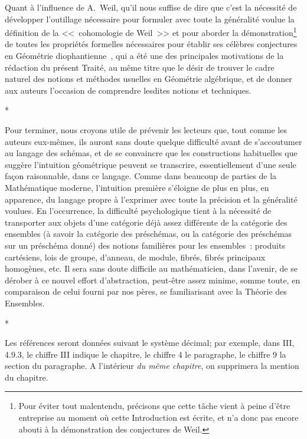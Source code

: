 Quant à l'influence de A.~Weil, qu'il nous suffise de dire que c'est la nécessité de développer l'outillage nécessaire pour formuler avec toute la généralité voulue la définition de la <<~cohomologie de Weil~>> et pour aborder la démonstration\footnote{Pour éviter tout malentendu, précisons que cette tâche vient à peine d'être entreprise au moment où cette Introduction est écrite, et n'a donc pas encore abouti à la démonstration des conjectures de Weil.} de toutes les propriétés formelles nécessaires pour établir ses célèbres conjectures en Géométrie diophantienne~\cite{I-19}, qui a été une des principales motivations de la rédaction du présent Traité, au même titre que le désir de trouver le cadre naturel des notions et méthodes usuelles en Géométrie algébrique, et de donner aux auteurs l'occasion de comprendre lesdites notions et techniques.

\bigskip
\begin{center}*\quad*\quad*\end{center}
\bigskip

Pour terminer, nous croyons utile de prévenir les lecteurs que, tout comme les auteurs eux-mêmes, ils auront sans doute quelque difficulté avant de s'accoutumer au langage des schémas, et de se convaincre que les constructions habituelles que suggère l'intuition géométrique peuvent se transcrire, essentiellement d'une seule façon raisonnable, dans ce langage.
Comme dans beaucoup de parties de la Mathématique moderne, l'intuition première s'éloigne de plus en plus, en apparence, du langage propre à l'exprimer avec toute la précision et la généralité voulues.
En l'occurrence, la difficulté psychologique tient à la nécessité de transporter aux objets d'une catégorie déjà assez différente de la catégorie des ensembles (à savoir la catégorie des préschémas, ou la catégorie des préschémas sur un préschéma donné) des notions familières pour les ensembles~: produits cartésiens, lois de groupe, d'anneau, de module, fibrés, fibrés principaux homogènes, etc.
Il sera sans doute difficile au mathématicien, dans l'avenir, de se dérober à ce nouvel effort d'abstraction, peut-être assez minime, somme toute, en comparaison de celui fourni par nos pères, se familiarisant avec la Théorie des Ensembles.

\bigskip
\begin{center}*\quad*\quad*\end{center}
\bigskip

Les références seront données suivant le système décimal; par exemple, dans III, 4.9.3, le chiffre III indique le chapitre, le chiffre 4 le paragraphe, le chiffre 9 la section du paragraphe.
A l'intérieur \emph{du même chapitre}, on supprimera la mention du chapitre.
